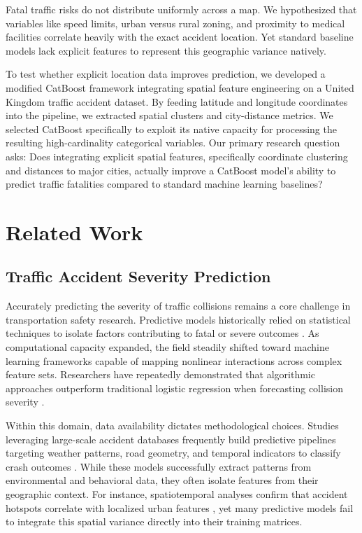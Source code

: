 \documentclass[runningheads]{llncs}
\begin{document}
Fatal traffic risks do not distribute uniformly across a map. We hypothesized that variables like speed limits, urban versus rural zoning, and proximity to medical facilities correlate heavily with the exact accident location. Yet standard baseline models lack explicit features to represent this geographic variance natively.

To test whether explicit location data improves prediction, we developed a modified CatBoost framework integrating spatial feature engineering on a United Kingdom traffic accident dataset. By feeding latitude and longitude coordinates into the pipeline, we extracted spatial clusters and city-distance metrics. We selected CatBoost specifically to exploit its native capacity for processing the resulting high-cardinality categorical variables. Our primary research question asks: Does integrating explicit spatial features, specifically coordinate clustering and distances to major cities, actually improve a CatBoost model's ability to predict traffic fatalities compared to standard machine learning baselines?


\section{Related Work}

\subsection{Traffic Accident Severity Prediction}
Accurately predicting the severity of traffic collisions remains a core challenge in transportation safety research. Predictive models historically relied on statistical techniques to isolate factors contributing to fatal or severe outcomes \cite{boulieri2016}. As computational capacity expanded, the field steadily shifted toward machine learning frameworks capable of mapping nonlinear interactions across complex feature sets. Researchers have repeatedly demonstrated that algorithmic approaches outperform traditional logistic regression when forecasting collision severity \cite{obasi2023,pradhan2019,tang2025}. 

Within this domain, data availability dictates methodological choices. Studies leveraging large-scale accident databases frequently build predictive pipelines targeting weather patterns, road geometry, and temporal indicators to classify crash outcomes \cite{mostafa2025}. While these models successfully extract patterns from environmental and behavioral data, they often isolate features from their geographic context. For instance, spatiotemporal analyses confirm that accident hotspots correlate with localized urban features \cite{kazmi2020}, yet many predictive models fail to integrate this spatial variance directly into their training matrices.
\end{document}
